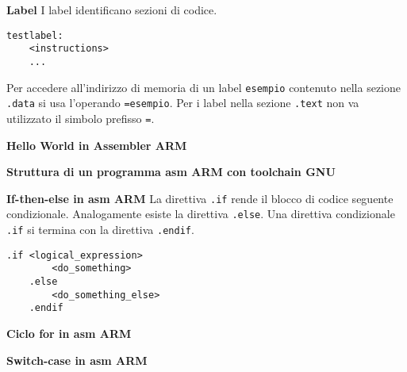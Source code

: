 \begin{defn}
	\textbf{Label}
	I label identificano sezioni di codice.
	
	\begin{lstlisting}[style=arm]
	testlabel: 
	<instructions>
	...
	\end{lstlisting}
	
	Per accedere all'indirizzo di memoria di un label \verb|esempio| contenuto nella sezione \verb|.data| si usa l'operando \verb|=esempio|. Per i label nella sezione \verb|.text| non va utilizzato il simbolo prefisso \verb|=|.
\end{defn}

\begin{exmp}
	\textbf{Hello World in Assembler ARM}
\end{exmp}

\begin{defn}
	\textbf{Struttura di un programma asm ARM con toolchain GNU}
\end{defn}

\begin{defn}
	\textbf{If-then-else in asm ARM}
	La direttiva \verb|.if| rende il blocco di codice seguente condizionale. Analogamente esiste la direttiva \verb|.else|. Una direttiva condizionale \verb|.if| si termina con la direttiva \verb|.endif|. 
	\begin{lstlisting}[style=arm]
	.if <logical_expression>
		<do_something>
	.else
		<do_something_else>
	.endif
	\end{lstlisting}
	
\end{defn}

\begin{defn}
	\textbf{Ciclo for in asm ARM}
\end{defn}

\begin{defn}
	\textbf{Switch-case in asm ARM}
\end{defn}